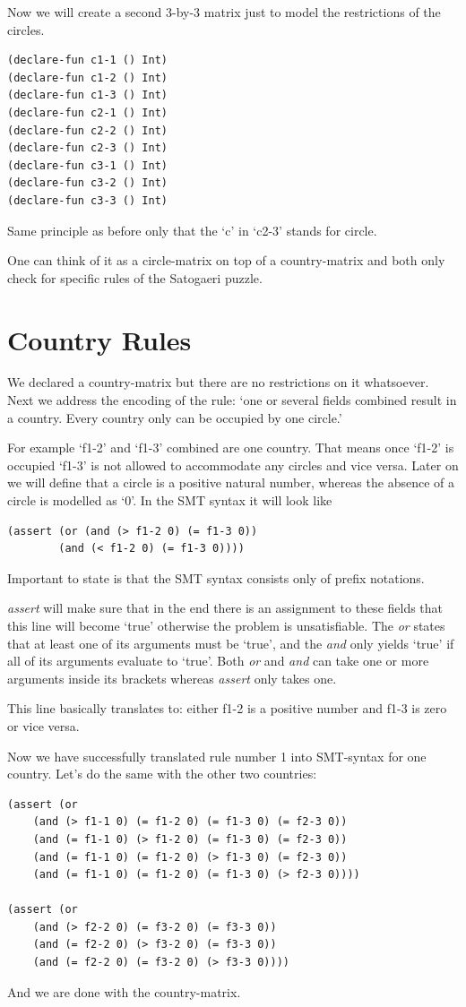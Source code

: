 Now we will create a second 3-by-3 matrix just to model the restrictions of the circles.
\begin{lstlisting}
(declare-fun c1-1 () Int)
(declare-fun c1-2 () Int)
(declare-fun c1-3 () Int)
(declare-fun c2-1 () Int)
(declare-fun c2-2 () Int)
(declare-fun c2-3 () Int)
(declare-fun c3-1 () Int)
(declare-fun c3-2 () Int)
(declare-fun c3-3 () Int)
\end{lstlisting}
Same principle as before only that the `c' in `c2-3' stands for circle.

One can think of it as a circle-matrix on top of a country-matrix and both only check for specific rules of the Satogaeri puzzle.

\section{Country Rules}
We declared a country-matrix but there are no restrictions on it whatsoever. Next we address the encoding of the rule: `one or several fields combined result in a country. Every country only can be occupied by one circle.'

For example `f1-2' and `f1-3' combined are one country. That means once `f1-2' is occupied `f1-3' is not allowed to accommodate any circles and vice versa. Later on we will define that a circle is a positive natural number, whereas the absence of a circle is modelled as `0'. In the SMT syntax it will look like
\begin{lstlisting}
(assert (or (and (> f1-2 0) (= f1-3 0)) 
	    (and (< f1-2 0) (= f1-3 0))))
\end{lstlisting}
Important to state is that the SMT syntax consists only of prefix notations. 

\emph{assert} will make sure that in the end there is an assignment to these fields that this line will become `true' otherwise the problem is unsatisfiable. The \emph{or} states that at least one of its arguments must be `true', and the \emph{and} only yields `true' if all of its arguments evaluate to `true'. Both \emph{or} and \emph{and} can take one or more arguments inside its brackets whereas \emph{assert} only takes one.

This line basically translates to: either f1-2 is a positive number and f1-3 is zero or vice versa.

Now we have successfully translated rule number 1 into SMT-syntax for one country. Let's do the same with the other two countries:

\begin{lstlisting}
(assert (or 
	(and (> f1-1 0) (= f1-2 0) (= f1-3 0) (= f2-3 0)) 
	(and (= f1-1 0) (> f1-2 0) (= f1-3 0) (= f2-3 0)) 
	(and (= f1-1 0) (= f1-2 0) (> f1-3 0) (= f2-3 0)) 
	(and (= f1-1 0) (= f1-2 0) (= f1-3 0) (> f2-3 0))))

(assert (or 
	(and (> f2-2 0) (= f3-2 0) (= f3-3 0)) 
	(and (= f2-2 0) (> f3-2 0) (= f3-3 0)) 
	(and (= f2-2 0) (= f3-2 0) (> f3-3 0))))
\end{lstlisting}
And we are done with the country-matrix.

